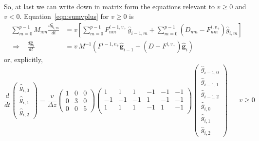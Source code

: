 \documentclass[10pt,a4paper]{article}
\begin{document}
So, at last we can write down in matrix form the equations relevant to $v \geq
0$ and $v < 0$. Equation~\ref{eqn:sumvplus} for $v \geq 0$ is
\begin{align*}
\sum_{m=0}^{p-1} M_{nm} \frac{d\hat{g}_{i,m}}{dt} & = v \left[
  \sum_{m=0}^{p-1} F_{nm}^{i-1,v_+}  \, \hat{g}_{i-1,m} + \sum_{m=0}^{p-1}
  \left(D_{nm} - F_{nm}^{i,v_+}\right) \hat{g}_{i,m} \right] \\
\Longrightarrow \;\;\;
\frac{d\hat{\mathbf{g}}_{i}}{dt} & = v \, M^{-1} \left( F^{i-1,v_+}
  \hat{\mathbf{g}}_{i-1} + \left(D - F^{i,v_+}\right)\hat{\mathbf{g}}_{i} \right)
\end{align*}
or, explicitly,
\begin{equation}
\frac{d}{dt} \left( \begin{array}{c}
\hat{g}_{i,0} \\ \hat{g}_{i,1} \\ \hat{g}_{i,2}
\end{array} \right)
=
\frac{v}{\Delta z} \left(
\begin{array}{ccc}
1 & 0 & 0 \\
0 & 3 & 0 \\
0 & 0 & 5
\end{array} \right)
\left(
\begin{array}{rrrrrr}
1 & 1 & 1 & -1 & -1 & -1 \\
-1 & -1 & -1 & 1 & -1 & -1 \\
1 & 1 & 1 & -1 & 1 & -1 \\
\end{array} \right)
\left( \begin{array}{c}
\hat{g}_{i-1,0} \\ \hat{g}_{i-1,1} \\ \hat{g}_{i-1,2} \\
\hat{g}_{i,0} \\ \hat{g}_{i,1} \\ \hat{g}_{i,2}
\end{array} \right)
 \;\;\;\;\;\; v \geq 0
\label{eqn:fullmatrixeqnvplus}
\end{equation}
\end{document}
